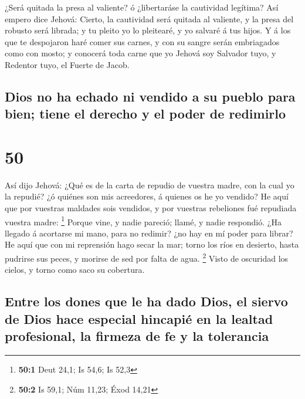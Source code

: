  ¿Será quitada la presa al valiente? ó ¿libertaráse la
cautividad legítima?  Así empero dice Jehová: Cierto, la
cautividad será quitada al valiente, y la presa del robusto será
librada; y tu pleito yo lo pleitearé, y yo salvaré á tus hijos.
 Y á los que te despojaron haré comer sus carnes, y con
su sangre serán embriagados como con mosto; y conocerá toda carne que yo
Jehová soy Salvador tuyo, y Redentor tuyo, el Fuerte de Jacob.

\hypertarget{dios-no-ha-echado-ni-vendido-a-su-pueblo-para-bien-tiene-el-derecho-y-el-poder-de-redimirlo}{%
\subsection{Dios no ha echado ni vendido a su pueblo para bien; tiene el
derecho y el poder de
redimirlo}\label{dios-no-ha-echado-ni-vendido-a-su-pueblo-para-bien-tiene-el-derecho-y-el-poder-de-redimirlo}}

\hypertarget{section-49}{%
\section{50}\label{section-49}}

 Así dijo Jehová: ¿Qué es de la carta de repudio de
vuestra madre, con la cual yo la repudié? ¿ó quiénes son mis acreedores,
á quienes os he yo vendido? He aquí que por vuestras maldades sois
vendidos, y por vuestras rebeliones fué repudiada vuestra madre:
\footnote{\textbf{50:1} Deut 24,1; Is 54,6; Is 52,3} 
Porque vine, y nadie pareció; llamé, y nadie respondió. ¿Ha llegado á
acortarse mi mano, para no redimir? ¿no hay en mí poder para librar? He
aquí que con mi reprensión hago secar la mar; torno los ríos en
desierto, hasta pudrirse sus peces, y morirse de sed por falta de agua.
\footnote{\textbf{50:2} Is 59,1; Núm 11,23; Éxod 14,21} 
Visto de oscuridad los cielos, y torno como saco su cobertura.

\hypertarget{entre-los-dones-que-le-ha-dado-dios-el-siervo-de-dios-hace-especial-hincapiuxe9-en-la-lealtad-profesional-la-firmeza-de-fe-y-la-tolerancia}{%
\subsection{Entre los dones que le ha dado Dios, el siervo de Dios hace
especial hincapié en la lealtad profesional, la firmeza de fe y la
tolerancia}\label{entre-los-dones-que-le-ha-dado-dios-el-siervo-de-dios-hace-especial-hincapiuxe9-en-la-lealtad-profesional-la-firmeza-de-fe-y-la-tolerancia}}

